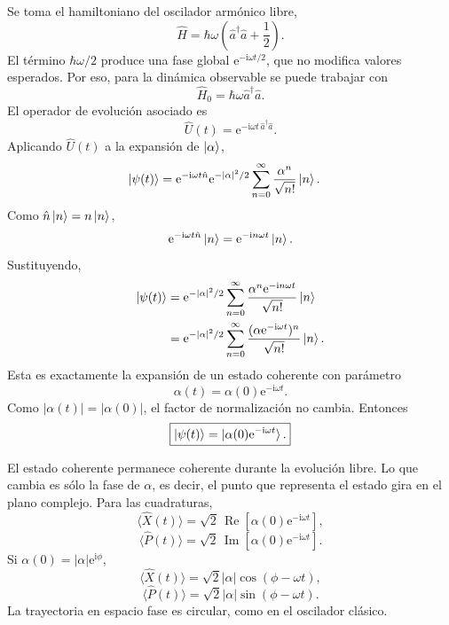 \documentclass[11pt]{article}
\newcommand{\ii}{\mathrm{i}}
\newcommand{\ee}{\mathrm{e}}
\newcommand{\adag}{\hat a^\dagger}
\newcommand{\Real}{\operatorname{Re}}
\newcommand{\Imag}{\operatorname{Im}}
\begin{document}
Se toma el hamiltoniano del oscilador arm\'onico libre,
\begin{equation}
  \hat H=\hbar\omega\left(\adag\hat a+\frac12\right).
\end{equation}
El t\'ermino $\hbar\omega/2$ produce una fase global
$\ee^{-\ii\omega t/2}$, que no modifica valores esperados. Por eso, para la
din\'amica observable se puede trabajar con
\begin{equation}
  \hat H_0=\hbar\omega\adag\hat a.
\end{equation}
El operador de evoluci\'on asociado es
\begin{equation}
  \hat U(t)=\ee^{-\ii\omega t\,\adag\hat a}.
\end{equation}
Aplicando $\hat U(t)$ a la expansi\'on de $\ket{\alpha}$,
\begin{align}
  \ket{\psi(t)}
  &=\ee^{-\ii\omega t\hat n}
    \ee^{-|\alpha|^2/2}
    \sum_{n=0}^{\infty}\frac{\alpha^n}{\sqrt{n!}}\ket n.
\end{align}
Como $\hat n\ket n=n\ket n$,
\begin{equation}
  \ee^{-\ii\omega t\hat n}\ket n
  =\ee^{-\ii n\omega t}\ket n.
\end{equation}
Sustituyendo,
\begin{align}
  \ket{\psi(t)}
  &=\ee^{-|\alpha|^2/2}
    \sum_{n=0}^{\infty}
    \frac{\alpha^n\ee^{-\ii n\omega t}}{\sqrt{n!}}\ket n\\
  &=\ee^{-|\alpha|^2/2}
    \sum_{n=0}^{\infty}
    \frac{(\alpha\ee^{-\ii\omega t})^n}{\sqrt{n!}}\ket n.
\end{align}
Esta es exactamente la expansi\'on de un estado coherente con par\'ametro
\begin{equation}
  \alpha(t)=\alpha(0)\ee^{-\ii\omega t}.
\end{equation}
Como $|\alpha(t)|=|\alpha(0)|$, el factor de normalizaci\'on no cambia.
Entonces
\begin{equation}
  \boxed{
  \ket{\psi(t)}=\ket{\alpha(0)\ee^{-\ii\omega t}}.
  }
\end{equation}

El estado coherente permanece coherente durante la evoluci\'on libre. Lo que
cambia es s\'olo la fase de $\alpha$, es decir, el punto que representa el
estado gira en el plano complejo. Para las cuadraturas,
\begin{equation}
  \langle\hat X(t)\rangle
  =\sqrt2\,\Real[\alpha(0)\ee^{-\ii\omega t}],
\end{equation}
\begin{equation}
  \langle\hat P(t)\rangle
  =\sqrt2\,\Imag[\alpha(0)\ee^{-\ii\omega t}].
\end{equation}
Si $\alpha(0)=|\alpha|\ee^{\ii\phi}$,
\begin{equation}
  \langle\hat X(t)\rangle
  =\sqrt2|\alpha|\cos(\phi-\omega t),
\end{equation}
\begin{equation}
  \langle\hat P(t)\rangle
  =\sqrt2|\alpha|\sin(\phi-\omega t).
\end{equation}
La trayectoria en espacio fase es circular, como en el oscilador cl\'asico.
\end{document}
